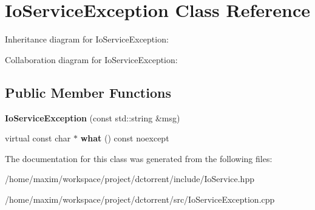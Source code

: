 \hypertarget{class_io_service_exception}{}\section{Io\+Service\+Exception Class Reference}
\label{class_io_service_exception}


Inheritance diagram for Io\+Service\+Exception\+:


Collaboration diagram for Io\+Service\+Exception\+:
\subsection*{Public Member Functions}
\begin{DoxyCompactItemize}
\item 
\mbox{\label{class_io_service_exception_a0c6c309f815b3ee7ed3422d5b4ac0aa5}} 
{\bfseries Io\+Service\+Exception} (const std\+::string \&msg)
\item 
\mbox{\label{class_io_service_exception_a123f1a3f928da87f5268c936979f89e5}} 
virtual const char $\ast$ {\bfseries what} () const noexcept
\end{DoxyCompactItemize}


The documentation for this class was generated from the following files\+:\begin{DoxyCompactItemize}
\item 
/home/maxim/workspace/project/dctorrent/include/Io\+Service.\+hpp\item 
/home/maxim/workspace/project/dctorrent/src/Io\+Service\+Exception.\+cpp\end{DoxyCompactItemize}
